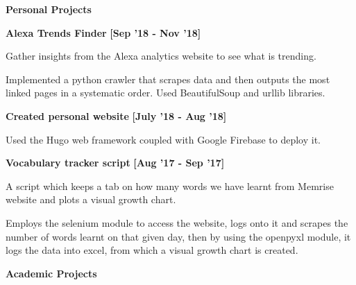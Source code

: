 \documentclass[a4paper,10pt]{article}
\begin{document}
\colorbox{titleColor}{\parbox{6.7in}{\textbf{Personal Projects}}}


\begin{itemize*}
  \setlength{\itemsep}{1pt}
  \item \textbf{\small{Alexa Trends Finder}} \hfill {\small{{\textbf{[Sep '18 - Nov '18]}}}\/} 
\begin{itemize*}
	\item Gather insights from the Alexa analytics website to see what is trending.
	\item Implemented a python crawler that scrapes data and then outputs the most linked pages in a systematic order. Used BeautifulSoup and urllib libraries.
\end{itemize*}
\end{itemize*}

\begin{itemize*}
  \setlength{\itemsep}{1pt}
  \item \textbf{\small{Created personal website}} \hfill {\small{{\textbf{[July '18 - Aug '18]}}}\/} 
\begin{itemize*}
	\item Used the Hugo web framework coupled with Google Firebase to deploy it.
	
\end{itemize*}
\end{itemize*}


\begin{itemize*}
  \setlength{\itemsep}{1pt}
  \item \textbf{\small{Vocabulary tracker script}} \hfill {\small{{\textbf{[Aug '17 - Sep '17]}}}\/} 
\begin{itemize*}
	\item A script which keeps a tab on how many words we have learnt from Memrise website and plots a visual growth chart.
	\item Employs the selenium module to access the website, logs onto it and scrapes the number of words learnt on that given day, then by using the openpyxl module, it logs the data into excel, from which a visual growth chart is created.
\end{itemize*}
\end{itemize*}





\colorbox{titleColor}{\parbox{6.7in}{\textbf{Academic Projects}}}
\end{document}

